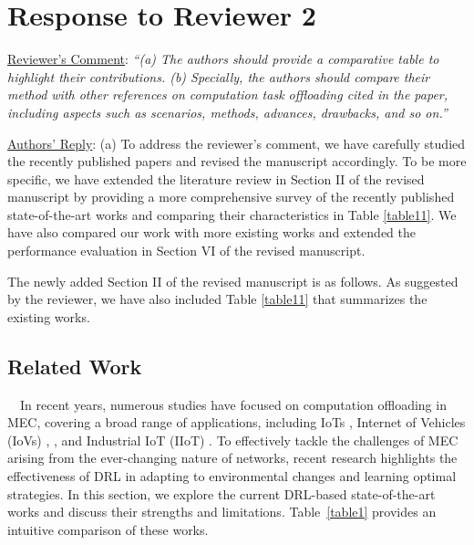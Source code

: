 \documentclass[12pt,draftclsnofoot,onecolumn]{IEEEtran}
\newcommand{\rev}[1]{{\color{blue}#1}} %
\newcommand{\rev}[1]{#1}
\newenvironment{my}[2]%
{\begin{list}{}%
{\setlength{\rightmargin}{#1}\setlength{\leftmargin}{#2}}%


 \item[]{}

} {\end{list}}
\begin{document}
\section{Response to Reviewer 2}
\begin{enumerate}
	
	\item \underline{Reviewer's Comment}: 
	\textit{``(a) The authors should provide a comparative table to highlight their contributions. (b) Specially, the authors should compare their method with other references on computation task offloading cited in the paper, including aspects such as scenarios, methods, advances, drawbacks, and so on.''} \newline

	\underline{Authors' Reply}: (a) To address the reviewer's comment, we have carefully studied the recently published papers and revised the manuscript accordingly. 
	To be more specific, we have extended the literature review in Section II of the revised manuscript by providing a more comprehensive survey of the recently published state-of-the-art works and comparing their characteristics in Table \ref{table11}.
	We have also compared our work with more existing works and extended the performance evaluation in Section VI of the revised manuscript. 


\vspace{3mm}
 The newly added Section II of the revised manuscript is as follows. As suggested by the reviewer, we have also included Table \ref{table11} that summarizes the existing works.
	
\begin{my}{1cm}{1cm}
	\rev{\setcounter{section}{1}
		\section{Related Work}
		\label{section:II}
		
		\,\,\,\,
		In recent years, numerous studies have focused on computation offloading in MEC, covering a broad range of applications, including IoTs \cite{zhang2023multi}, Internet of Vehicles (IoVs) \cite{lin2022multi}, \cite{wei2023many}, and Industrial IoT (IIoT) \cite{yuan2023adaptive}. 
		To effectively tackle the challenges of MEC arising from the ever-changing nature of networks, recent research highlights the effectiveness of DRL in adapting to environmental changes and learning optimal strategies. In this section, we explore the current DRL-based state-of-the-art works and discuss their strengths and limitations. Table~\ref{table1} provides an intuitive comparison of these works.
}
\end{my}
\end{enumerate}
\end{document}

